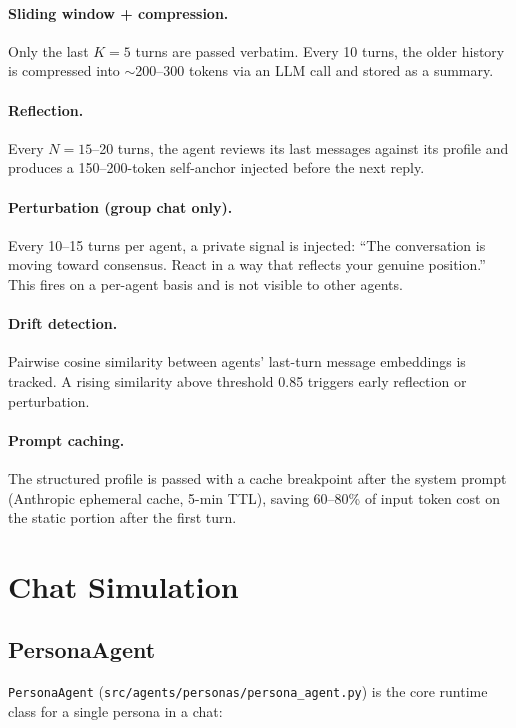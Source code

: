 \documentclass[12pt,a4paper]{article}
\begin{document}
\paragraph{Sliding window + compression.}
Only the last $K = 5$ turns are passed verbatim. Every 10 turns, the older history is
compressed into $\sim$200--300 tokens via an LLM call and stored as a summary.

\paragraph{Reflection.}
Every $N = 15$--20 turns, the agent reviews its last messages against its profile and
produces a 150--200-token self-anchor injected before the next reply.

\paragraph{Perturbation (group chat only).}
Every 10--15 turns per agent, a private signal is injected: ``The conversation is moving
toward consensus. React in a way that reflects your genuine position.'' This fires on a
per-agent basis and is not visible to other agents.

\paragraph{Drift detection.}
Pairwise cosine similarity between agents' last-turn message embeddings is tracked. A
rising similarity above threshold 0.85 triggers early reflection or perturbation.

\paragraph{Prompt caching.}
The structured profile is passed with a cache breakpoint after the system prompt
(Anthropic ephemeral cache, 5-min TTL), saving 60--80\% of input token cost on the
static portion after the first turn.

\section{Chat Simulation}

\subsection{PersonaAgent}

\texttt{PersonaAgent} (\texttt{src/agents/personas/persona\_agent.py}) is the core runtime
class for a single persona in a chat:
\end{document}
